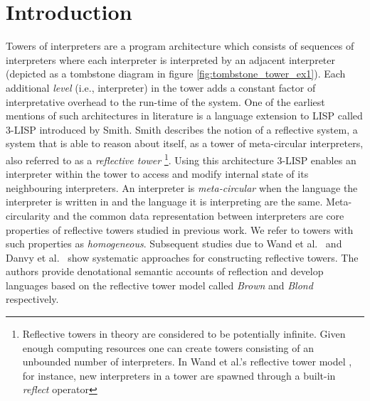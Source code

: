 \documentclass[a4paper,12pt,twoside,openright]{report}
\theoremstyle{definition}
\begin{document}
\section{Introduction}
Towers of interpreters are a program architecture which consists of sequences of interpreters where each interpreter is interpreted by an adjacent interpreter (depicted as a tombstone diagram in figure \ref{fig:tombstone_tower_ex1}). Each additional \textit{level} (i.e., interpreter) in the tower adds a constant factor of interpretative overhead to the run-time of the system. One of the earliest mentions of such architectures in literature is a language extension to LISP called 3-LISP \cite{smith1984reflection} introduced by Smith. Smith describes the notion of a reflective system, a system that is able to reason about itself, as a tower of meta-circular interpreters, also referred to as a \textit{reflective tower} \footnote{Reflective towers in theory  are considered to be potentially infinite. Given enough computing resources one can create towers consisting of an unbounded number of interpreters. In Wand et al.'s reflective tower model \cite{wand1988mystery}, for instance, new interpreters in a tower are spawned through a built-in \textit{reflect} operator}. Using this architecture 3-LISP enables an interpreter within the tower to access and modify internal state of its neighbouring interpreters. An interpreter is \textit{meta-circular} when the language the interpreter is written in and the language it is interpreting are the same. Meta-circularity and the common data representation between interpreters are core properties of reflective towers studied in previous work. We refer to towers with such properties as \textit{homogeneous}. Subsequent studies due to Wand et al.~\cite{wand1988mystery} and Danvy et al.~\cite{danvy1988intensions} show systematic approaches for constructing reflective towers. The authors provide denotational semantic accounts of reflection and develop languages based on the reflective tower model called \textit{Brown} and \textit{Blond} respectively.
\end{document}
